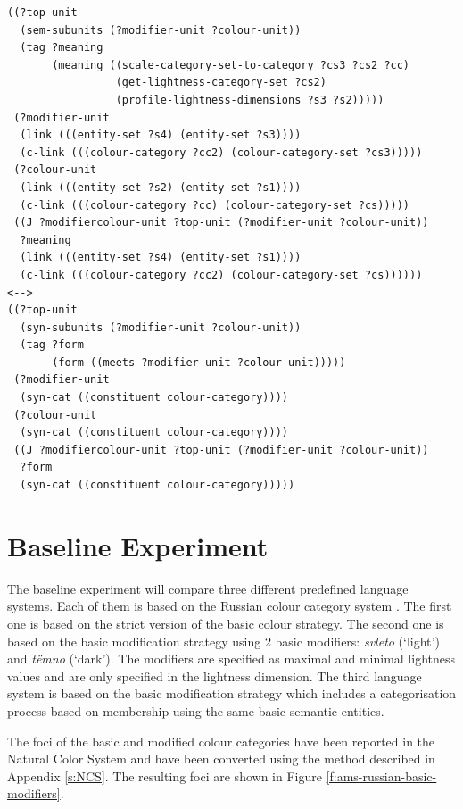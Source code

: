 \footnotesize
{}
\begin{lstlisting}
((?top-unit
  (sem-subunits (?modifier-unit ?colour-unit))
  (tag ?meaning
       (meaning ((scale-category-set-to-category ?cs3 ?cs2 ?cc)
                 (get-lightness-category-set ?cs2)
                 (profile-lightness-dimensions ?s3 ?s2)))))
 (?modifier-unit
  (link (((entity-set ?s4) (entity-set ?s3))))
  (c-link (((colour-category ?cc2) (colour-category-set ?cs3)))))
 (?colour-unit
  (link (((entity-set ?s2) (entity-set ?s1))))
  (c-link (((colour-category ?cc) (colour-category-set ?cs)))))
 ((J ?modifiercolour-unit ?top-unit (?modifier-unit ?colour-unit))
  ?meaning
  (link (((entity-set ?s4) (entity-set ?s1))))
  (c-link (((colour-category ?cc2) (colour-category-set ?cs))))))
<-->
((?top-unit
  (syn-subunits (?modifier-unit ?colour-unit))
  (tag ?form 
       (form ((meets ?modifier-unit ?colour-unit)))))
 (?modifier-unit 
  (syn-cat ((constituent colour-category))))
 (?colour-unit 
  (syn-cat ((constituent colour-category))))
 ((J ?modifiercolour-unit ?top-unit (?modifier-unit ?colour-unit))
  ?form
  (syn-cat ((constituent colour-category)))))
\end{lstlisting}
\normalsize

\section{Baseline Experiment}

The baseline experiment will compare three different predefined language
systems. Each of them is based on the Russian colour category system
\citep{safuanova07russian}. The first one is based on the strict
version of the basic colour strategy. The second one is based
on the basic modification strategy using 2 basic
modifiers: \textit{svleto} (`light') and \textit{t\"emno} (`dark'). The modifiers
are specified as maximal and minimal lightness values and are only
specified in the lightness dimension. The third language system is
based on the basic modification strategy which includes a
categorisation process based on membership using the same basic
semantic entities.

The foci of the basic and modified colour categories have been
reported in the Natural Color System \citep{safuanova07russian} and
have been converted using the method described in Appendix
\ref{s:NCS}. The resulting foci are shown in Figure
\ref{f:ams-russian-basic-modifiers}.

